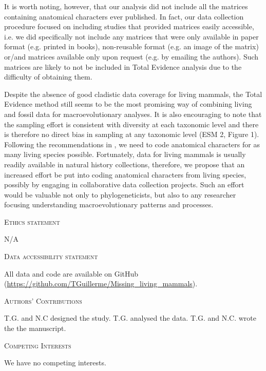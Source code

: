 \documentclass[12pt,letterpaper]{article}
\renewcommand{\section}[1]{%
\bigskip
\begin{center}
\begin{Large}
\normalfont\scshape #1
\medskip
\end{Large}
\end{center}}
\begin{document}
It is worth noting, however, that our analysis did not include all the matrices containing anatomical characters ever published.
In fact, our data collection procedure focused on including studies that provided matrices easily accessible, i.e. we did specifically not include any matrices that were only available in paper format (e.g. printed in books), non-reusable format (e.g. an image of the matrix) %
or/and matrices available only upon request (e.g. by emailing the authors).
Such matrices are likely to not be included in Total Evidence analysis due to the difficulty of obtaining them.

Despite the absence of good cladistic data coverage for living mammals, %
 the Total Evidence method still seems to be the most promising way of combining living and fossil data for macroevolutionary analyses.
It is also encouraging to note that the sampling effort is consistent with diversity at each taxonomic level and there is therefore no direct bias in sampling at any taxonomic level (ESM 2, Figure 1).
Following the recommendations in \cite{GuillermeCooper}, we need to code anatomical characters for as many living species possible. 
Fortunately, data for living mammals is usually readily available in natural history collections, therefore, we propose that an increased effort be put into coding anatomical characters from living species, possibly by engaging in collaborative data collection projects.
Such an effort would be valuable not only to phylogeneticists, but also to any researcher focusing understanding macroevolutionary patterns and processes.

\section{Ethics statement}
N/A
\section{Data accessibility statement}
All data and code are available on GitHub (\url{https://github.com/TGuillerme/Missing_living_mammals}).
\section{Authors' Contributions}
T.G. and N.C designed the study. T.G. analysed the data. T.G. and N.C. wrote the the manuscript.
\section{Competing Interests}
We have no competing interests.
\end{document}
